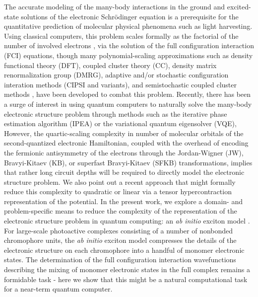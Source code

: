 \documentclass[aps,prl,twocolumn,showpacs,superscriptaddress,groupedaddress]{revtex4}  %
\begin{document}
The accurate modeling of the many-body interactions in the ground and
excited-state solutions of the electronic Schr\"odinger equation is a
prerequisite for the quantitative prediction of molecular physical phenomena such
as light harvesting. Using classical computers, this problem scales formally as
the factorial of the number of involved electrons \cite{PurpleBook}, via the
solution of the full configuration interaction (FCI) equations, though many
polynomial-scaling approximations such as density functional theory \cite{
Hohenberg:1964:B864,
Kohn:1965:A1133,
Runge:1984:997,
Koch:2001:DFT}
(DFT), coupled cluster theory \cite{
Cizek:1966:4256,
Purvis:1982,
Crawford:2007:33,
Bartlett}
(CC), density matrix renormalization group \cite{
White:1992:2863,
Chan:2011:465}
(DMRG),
adaptive and/or stochastic configuration interation methods \cite{
bender1969studies,
huron1973iterative,
booth2009fermion,
cleland2010communications,
holmes2016heat,
Schriber:2016:161106,
schriber2017adaptive}
(CIPSI and variants),
and semistochastic coupled cluster methods \cite{
deustua2017converging,
deustua2018communication},
have been developed to combat this problem. Recently, there has been a
surge of interest in using quantum computers to naturally solve the many-body
electronic structure problem through methods such as the iterative phase
estimation algorithm \cite{
Abrams:1997:2586,
Abrams:1999:5162,
Aspuru:2005:1704,
Lanyon:2010:106,
Wecker:2014:022305,
Tubman:2018:X}
(IPEA) or the variational quantum eigensolver \cite{ 
Peruzzo:2014:4213,
McClean:2016:023023,
OMalley:2016:031007,
Kandala:2017:242,
McClean:2017:X,
Romero:2018:104008}
(VQE), However, the quartic-scaling complexity in number of molecular orbitals
of the second-quantized electronic Hamiltonian, coupled with the overhead of
encoding the fermionic antisymmetry of the electrons through the Jordan-Wigner
\cite{Jordan:1928:631,Ortiz:2001:022319} (JW), Bravyi-Kitaev
\cite{Bravyi:2002:210,Seeley:2012:224109} (KB), or superfast Bravyi-Kitaev
\cite{Setia:2017:X,Setia:2018:X} (SFKB) transformations, implies that rather
long circuit depths will be required to directly model the electronic structure
problem. We also point out a recent approach \cite{Babbush:2017:X,
Kivlichan:2018:110501,Motta:2018:X} that might formally reduce this complexity
to quadratic or linear via a tensor hypercontraction representation
\cite{Hohenstein:2012:044103,Parrish:2012:224106,Parrish:2013:132505} of the
potential. In the present work, we explore a domain- and problem-specific means
to reduce the complexity of the representation of the electronic structure
problem in quantum computing: an \emph{ab initio} exciton model \cite{
Sisto:2014:2857,
Sisto:2017:14924,
Li:2017:3493,
Morrison:2014:5366,
Morrison:2015:4390}. For large-scale photoactive complexes consisting of a
number of nonbonded chromophore units, the \emph{ab initio} exciton model
compresses the details of the electronic structure on each chromophore into a
handful of monomer electronic states. The determination of the full
configuration interaction wavefunctions describing the mixing of monomer
electronic states in the full complex remains a formidable task - here we show
that this might be a natural computational task for a near-term quantum
computer.
\end{document}
